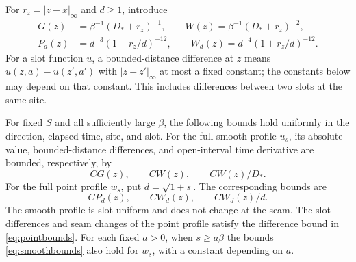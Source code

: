 For $r_z=|z-x|_\infty$ and $d\ge1$, introduce
\begin{equation}\label{eq:weights}
 \begin{split}
 G(z)&=\beta^{-1}(D_*+r_z)^{-1},\qquad
 W(z)=\beta^{-1}(D_*+r_z)^{-2},\\
 P_d(z)&=d^{-3}(1+r_z/d)^{-12},\qquad
 W_d(z)=d^{-4}(1+r_z/d)^{-12}.
 \end{split}
\end{equation}
For a slot function $u$, a bounded-distance difference at $z$ means
$u(z,a)-u(z',a')$ with $|z-z'|_\infty$ at most a fixed constant;
the constants below may depend on that constant.  This includes
differences between two slots at the same site.

\begin{lemma}\label{lem:freebounds}
For fixed $S$ and all sufficiently large $\beta$, the following
bounds hold uniformly in the direction, elapsed time, site, and slot.
For the full smooth profile $u_s$, its absolute value,
bounded-distance differences, and open-interval time derivative are
bounded, respectively, by
\begin{equation}\label{eq:smoothbounds}
 C G(z),\qquad C W(z),\qquad C W(z)/D_*.
\end{equation}
For the full point profile $w_s$, put $d=\sqrt{1+s}$.
The corresponding bounds are
\begin{equation}\label{eq:pointbounds}
 C P_d(z),\qquad C W_d(z),\qquad C W_d(z)/d.
\end{equation}
The smooth profile is slot-uniform and does not change at the seam.
The slot differences and seam changes of the point profile satisfy
the difference bound in \eqref{eq:pointbounds}.
For each fixed $a>0$, when $s\ge a\beta$ the bounds
\eqref{eq:smoothbounds} also hold for $w_s$, with a constant depending
on $a$.
\end{lemma}

